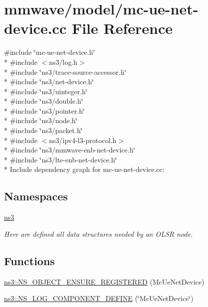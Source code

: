\hypertarget{mc-ue-net-device_8cc}{}\section{mmwave/model/mc-\/ue-\/net-\/device.cc File Reference}
\label{mc-ue-net-device_8cc}
{\ttfamily \#include \char`\"{}mc-\/ue-\/net-\/device.\+h\char`\"{}}\\*
{\ttfamily \#include $<$ns3/log.\+h$>$}\\*
{\ttfamily \#include \char`\"{}ns3/trace-\/source-\/accessor.\+h\char`\"{}}\\*
{\ttfamily \#include \char`\"{}ns3/net-\/device.\+h\char`\"{}}\\*
{\ttfamily \#include \char`\"{}ns3/uinteger.\+h\char`\"{}}\\*
{\ttfamily \#include \char`\"{}ns3/double.\+h\char`\"{}}\\*
{\ttfamily \#include \char`\"{}ns3/pointer.\+h\char`\"{}}\\*
{\ttfamily \#include \char`\"{}ns3/node.\+h\char`\"{}}\\*
{\ttfamily \#include \char`\"{}ns3/packet.\+h\char`\"{}}\\*
{\ttfamily \#include $<$ns3/ipv4-\/l3-\/protocol.\+h$>$}\\*
{\ttfamily \#include \char`\"{}ns3/mmwave-\/enb-\/net-\/device.\+h\char`\"{}}\\*
{\ttfamily \#include \char`\"{}ns3/lte-\/enb-\/net-\/device.\+h\char`\"{}}\\*
Include dependency graph for mc-\/ue-\/net-\/device.cc\+:
\subsection*{Namespaces}
\begin{DoxyCompactItemize}
\item 
 \hyperlink{namespacens3}{ns3}
\begin{DoxyCompactList}\small\item\em Here are defined all data structures needed by an O\+L\+SR node. \end{DoxyCompactList}\end{DoxyCompactItemize}
\subsection*{Functions}
\begin{DoxyCompactItemize}
\item 
\hyperlink{namespacens3_a991df3c116b4580cbe19aa2e0ae9c81d}{ns3\+::\+N\+S\+\_\+\+O\+B\+J\+E\+C\+T\+\_\+\+E\+N\+S\+U\+R\+E\+\_\+\+R\+E\+G\+I\+S\+T\+E\+R\+ED} (Mc\+Ue\+Net\+Device)
\item 
\hyperlink{namespacens3_a33f8c69ad74b6f7fa4e31613a0800fcf}{ns3\+::\+N\+S\+\_\+\+L\+O\+G\+\_\+\+C\+O\+M\+P\+O\+N\+E\+N\+T\+\_\+\+D\+E\+F\+I\+NE} (\char`\"{}Mc\+Ue\+Net\+Device\char`\"{})
\end{DoxyCompactItemize}
